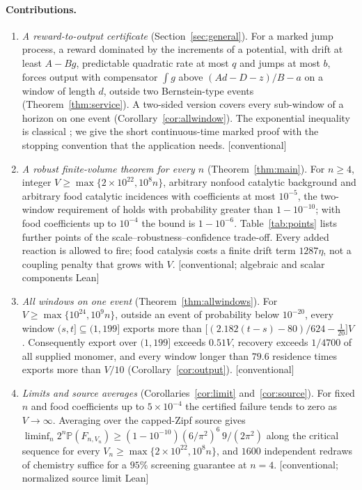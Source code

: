 \documentclass[11pt,letterpaper]{article}
\theoremstyle{plain}
\theoremstyle{definition}
\theoremstyle{remark}
\numberwithin{equation}{section}
\newcommand{\PP}{\mathbb P}
\newcommand{\evid}[1]{{\normalfont\small\textsf{[}#1\textsf{]}}}
\begin{document}
\paragraph{Contributions.}
\begin{enumerate}[label=(\roman*)]
\item \emph{A reward-to-output certificate} (Section~\ref{sec:general}). For a marked jump process, a reward dominated by the increments of a potential, with drift at least $A-Bg$, predictable quadratic rate at most $q$ and jumps at most $b$, forces output with compensator $\int g$ above $(Ad-D-z)/B-a$ on a window of length $d$, outside two Bernstein-type events (Theorem~\ref{thm:service}). A two-sided version covers every sub-window of a horizon on one event (Corollary~\ref{cor:allwindow}). The exponential inequality is classical \cite{freedman1975tail,vandegeer1995exponential,dzhaparidze2001bernstein}; we give the short continuous-time marked proof with the stopping convention that the application needs. \evid{conventional}
\item \emph{A robust finite-volume theorem for every $n$} (Theorem~\ref{thm:main}). For $n\ge4$, integer $V\ge\max\{2\times10^{22},10^8n\}$, arbitrary nonfood catalytic background and arbitrary food catalytic incidences with coefficients at most $10^{-5}$, the two-window requirement of \cite{twowindow2026} holds with probability greater than $1-10^{-10}$; with food coefficients up to $10^{-4}$ the bound is $1-10^{-6}$. Table~\ref{tab:points} lists further points of the scale--robustness--confidence trade-off. Every added reaction is allowed to fire; food catalysis costs a finite drift term $1287\eta$, not a coupling penalty that grows with $V$. \evid{conventional; algebraic and scalar components Lean}
\item \emph{All windows on one event} (Theorem~\ref{thm:allwindows}). For $V\ge\max\{10^{24},10^9n\}$, outside an event of probability below $10^{-20}$, every window $(s,t]\subseteq(1,199]$ exports more than $\bigl[(2.182(t-s)-80)/624-\tfrac1{20}\bigr]V$. Consequently export over $(1,199]$ exceeds $0.51V$, recovery exceeds $1/4700$ of all supplied monomer, and every window longer than $79.6$ residence times exports more than $V/10$ (Corollary~\ref{cor:output}). \evid{conventional}
\item \emph{Limits and source averages} (Corollaries~\ref{cor:limit} and~\ref{cor:source}). For fixed $n$ and food coefficients up to $5\times10^{-4}$ the certified failure tends to zero as $V\to\infty$. Averaging over the capped-Zipf source gives $\liminf_n2^n\PP(F_{n,V_n})\ge(1-10^{-10})(6/\pi^2)^6\,9/(2\pi^2)$ along the critical sequence for every $V_n\ge\max\{2\times10^{22},10^8n\}$, and $1600$ independent redraws of chemistry suffice for a $95\%$ screening guarantee at $n=4$. \evid{conventional; normalized source limit Lean}

\end{enumerate}
\end{document}
